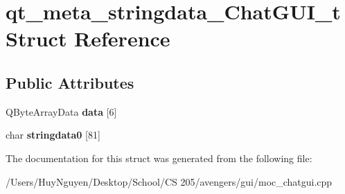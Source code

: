 \hypertarget{structqt__meta__stringdata__ChatGUI__t}{}\section{qt\+\_\+meta\+\_\+stringdata\+\_\+\+Chat\+G\+U\+I\+\_\+t Struct Reference}
\label{structqt__meta__stringdata__ChatGUI__t}
\subsection*{Public Attributes}
\begin{DoxyCompactItemize}
\item 
Q\+Byte\+Array\+Data {\bfseries data} \mbox{[}6\mbox{]}\hypertarget{structqt__meta__stringdata__ChatGUI__t_aad728279283a2fbeb8dd36708528531a}{}\label{structqt__meta__stringdata__ChatGUI__t_aad728279283a2fbeb8dd36708528531a}

\item 
char {\bfseries stringdata0} \mbox{[}81\mbox{]}\hypertarget{structqt__meta__stringdata__ChatGUI__t_a9362be2df2e0212de167d85f08f58c9d}{}\label{structqt__meta__stringdata__ChatGUI__t_a9362be2df2e0212de167d85f08f58c9d}

\end{DoxyCompactItemize}


The documentation for this struct was generated from the following file\+:\begin{DoxyCompactItemize}
\item 
/\+Users/\+Huy\+Nguyen/\+Desktop/\+School/\+C\+S 205/avengers/gui/moc\+\_\+chatgui.\+cpp\end{DoxyCompactItemize}
